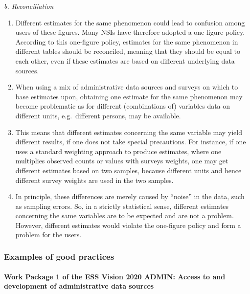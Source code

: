 \documentclass[
]{article}
\begin{document}
\emph{b. Reconciliation}

\begin{enumerate}
\def\labelenumi{\arabic{enumi}.}
\setcounter{enumi}{239}
\item
  Different estimates for the same phenomenon could lead to confusion
  among users of these figures. Many NSIs have therefore adopted a
  one-figure policy. According to this one-figure policy, estimates
  for the same phenomenon in different tables should be reconciled,
  meaning that they should be equal to each other, even if these
  estimates are based on different underlying data sources.
\item
  When using a mix of administrative data sources and surveys on
  which to base estimates upon, obtaining one estimate for the same
  phenomenon may become problematic as for different (combinations of)
  variables data on different units, e.g.~different persons, may be
  available.
\item
  This means that different estimates concerning the same variable
  may yield different results, if one does not take special
  precautions. For instance, if one uses a standard weighting approach
  to produce estimates, where one multiplies observed counts or values
  with surveys weights, one may get different estimates based on two
  samples, because different units and hence different survey weights
  are used in the two samples.
\item
  In principle, these differences are merely caused by ``noise'' in the
  data, such as sampling errors. So, in a strictly statistical sense,
  different estimates concerning the same variables are to be expected
  and are not a problem. However, different estimates would violate
  the one-figure policy and form a problem for the users.
\end{enumerate}

\hypertarget{d.5.-examples-of-good-practices}{%
\subsubsection{Examples of good practices}\label{d.5.-examples-of-good-practices}}

\hypertarget{work-package-1-of-the-ess-vision-2020-admin-access-to-and-development-of-administrative-data-sources}{%
\paragraph{Work Package 1 of the ESS Vision 2020 ADMIN: Access to and development of administrative data sources}\label{work-package-1-of-the-ess-vision-2020-admin-access-to-and-development-of-administrative-data-sources}}
\end{document}
